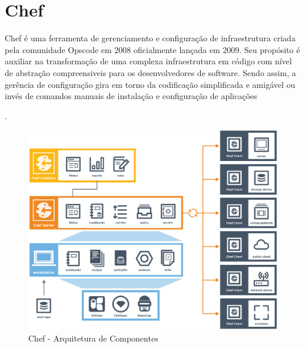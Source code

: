 \section{Chef}
\label{sec:chef}

Chef é uma ferramenta de gerenciamento e configuração de infraestrutura criada
pela comunidade Opscode em 2008 oficialmente lançada em 2009. Seu propósito é
auxiliar na transformação de uma complexa infraestrutura em código com nível
de abstração compreensiveis para os desenvolvedores de software. Sendo assim,
a gerência de configuração gira em torno da codificação simplificada e amigável
ou invés de comandos manuais de instalação e configuração de aplicações \cite{sharma:2015}

\cite{sharma:2015}.

\begin{figure}[h]
  \label{fig:arch_chef}
  \centering
  \includegraphics[width=\textwidth]{figuras/arch_chef.eps}
  \caption{Chef - Arquitetura de Componentes}
\end{figure}

\subsection{}
